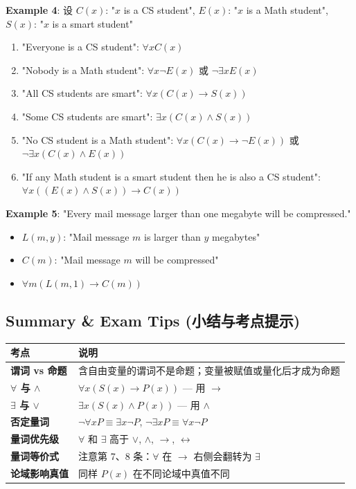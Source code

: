 \documentclass[10pt,a4paper,openany]{ctexbook}
\theoremstyle{definition}
\theoremstyle{remark}
\begin{document}
\textbf{Example 4}: 设 $C(x)$: "$x$ is a CS student", $E(x)$: "$x$ is a Math student", $S(x)$: "$x$ is a smart student"
\begin{enumerate}
\item "Everyone is a CS student": $\forall x C(x)$
\item "Nobody is a Math student": $\forall x \neg E(x)$ 或 $\neg \exists x E(x)$
\item "All CS students are smart": $\forall x (C(x) \to S(x))$
\item "Some CS students are smart": $\exists x (C(x) \land S(x))$
\item "No CS student is a Math student": $\forall x (C(x) \to \neg E(x))$ 或 $\neg \exists x (C(x) \land E(x))$
\item "If any Math student is a smart student then he is also a CS student": $\forall x ((E(x) \land S(x)) \to C(x))$

\end{enumerate}

\textbf{Example 5}: "Every mail message larger than one megabyte will be compressed."
\begin{itemize}
\item $L(m, y)$: "Mail message $m$ is larger than $y$ megabytes"
\item $C(m)$: "Mail message $m$ will be compressed"
\item $\forall m (L(m, 1) \to C(m))$

\end{itemize}

\vspace{-2pt}

\subsection{Summary \& Exam Tips (小结与考点提示)}

\begin{center}
\begin{tabular}{ll}
\hline
考点 & 说明 \\ \hline
\textbf{谓词 vs 命题} & 含自由变量的谓词不是命题；变量被赋值或量化后才成为命题 \\
\textbf{$\forall$ 与 $\land$} & $\forall x (S(x) \to P(x))$ — 用 $\to$ \\
\textbf{$\exists$ 与 $\lor$} & $\exists x (S(x) \land P(x))$ — 用 $\land$ \\
\textbf{否定量词} & $\neg \forall x P \equiv \exists x \neg P$, $\neg \exists x P \equiv \forall x \neg P$ \\
\textbf{量词优先级} & $\forall$ 和 $\exists$ 高于 $\lor$, $\land$, $\to$, $\leftrightarrow$ \\
\textbf{量词等价式} & 注意第 7、8 条：$\forall$ 在 $\to$ 右侧会翻转为 $\exists$ \\
\textbf{论域影响真值} & 同样 $P(x)$ 在不同论域中真值不同 \\
\hline
\end{tabular}

\end{center}
\end{document}

